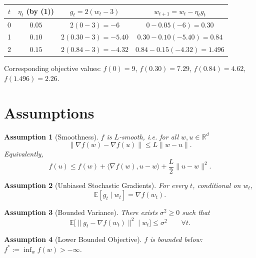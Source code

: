 \documentclass{article}
\newtheorem{assumption}{Assumption}
\begin{document}
\begin{center}
\begin{tabular}{c|c|c|c}
$t$ & $\eta_t$ (by (1)) & $g_t=2(w_t-3)$ & $w_{t+1}=w_t-\eta_t g_t$ \\ \hline
0 & $0.05$ & $2(0-3)=-6$ & $0-0.05(-6)=0.30$ \\
1 & $0.10$ & $2(0.30-3)=-5.40$ & $0.30-0.10(-5.40)=0.84$ \\
2 & $0.15$ & $2(0.84-3)=-4.32$ & $0.84-0.15(-4.32)=1.496$ 
\end{tabular}
\end{center}
Corresponding objective values: $f(0)=9$, $f(0.30)=7.29$, $f(0.84)=4.62$, $f(1.496)=2.26$.

\newpage
\section*{Assumptions}
\begin{assumption}[Smoothness]\label{ass:smooth}
$f$ is $L$‑smooth, i.e. for all $w,u\in\mathbb{R}^{d}$
\[
\|\nabla f(w)-\nabla f(u)\|\le L\|w-u\| .
\tag{3}
\]
Equivalently,
\[
f(u)\le f(w)+\langle\nabla f(w),u-w\rangle+\frac{L}{2}\|u-w\|^{2}.
\tag{4}
\]
\end{assumption}

\begin{assumption}[Unbiased Stochastic Gradients]\label{ass:unbiased}
For every $t$, conditional on $w_t$,
\[
\mathbb{E}[g_t\mid w_t]=\nabla f(w_t).
\tag{5}
\]
\end{assumption}

\begin{assumption}[Bounded Variance]\label{ass:variance}
There exists $\sigma^{2}\ge0$ such that
\[
\mathbb{E}\big[\|g_t-\nabla f(w_t)\|^{2}\mid w_t\big]\le\sigma^{2}\qquad\forall t .
\tag{6}
\]
\end{assumption}

\begin{assumption}[Lower Bounded Objective]\label{ass:lower}
$f$ is bounded below: $f^{*}:=\inf_{w}f(w)>-\infty$.
\end{assumption}
\end{document}
